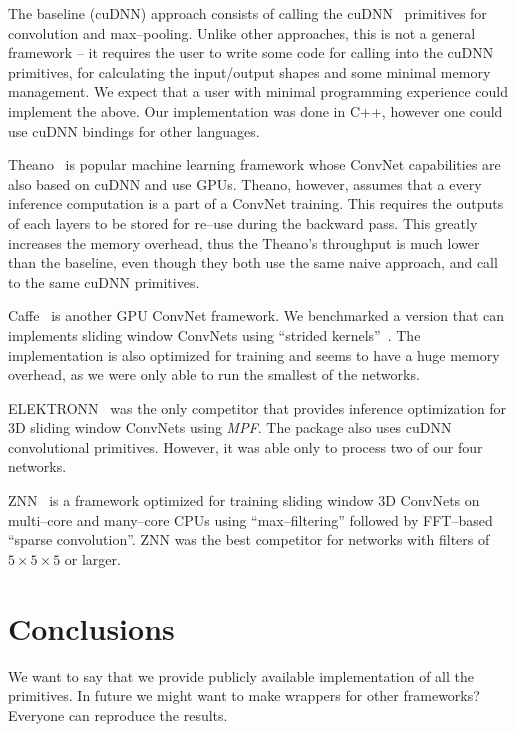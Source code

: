 \documentclass[conference]{./IEEEtran/IEEEtran}
\begin{document}
  The baseline (cuDNN) approach consists of calling the
  cuDNN~\cite{chetlur2014cudnn} primitives for convolution and
  max--pooling.  Unlike other approaches, this is not a general framework
  -- it requires the user to write some code for calling into the
  cuDNN primitives, for calculating the input/output shapes and some
  minimal memory management.  We expect that a user with minimal
  programming experience could implement the above.  Our
  implementation was done in C++, however one could use cuDNN bindings
  for other languages.

  Theano~\cite{bergstra2010theano} is popular machine learning
  framework whose ConvNet capabilities are also based on cuDNN and use
  GPUs.  Theano, however, assumes that a every inference computation
  is a part of a ConvNet training.  This requires the outputs of each
  layers to be stored for re--use during the backward pass.  This
  greatly increases the memory overhead, thus the Theano's throughput
  is much lower than the baseline, even though they both use the same
  naive approach, and call to the same cuDNN primitives.

  Caffe~\cite{jia2014caffe} is another GPU ConvNet framework.  We
  benchmarked a version that can implements sliding window ConvNets
  using ``strided kernels''~\cite{tschopp2015efficient}.  The
  implementation is also optimized for training and seems to have a
  huge memory overhead, as we were only able to run the smallest of
  the networks.

  ELEKTRONN~\cite{ELEKTRON2015} was the only competitor that provides
  inference optimization for 3D sliding window ConvNets using
  \emph{MPF}.  The package also uses cuDNN convolutional primitives.
  However, it was able only to process two of our four networks.

  ZNN~\cite{zlateski2015znn} is a framework optimized for training
  sliding window 3D ConvNets on multi--core and many--core CPUs using
  ``max--filtering'' followed by FFT--based ``sparse convolution''.
  ZNN was the best competitor for networks with filters of $5 \times 5
  \times 5$ or larger.



\section{Conclusions}

  We want to say that we provide publicly available implementation of
  all the primitives.  In future we might want to make wrappers for
  other frameworks?  Everyone can reproduce the results.
\end{document}
